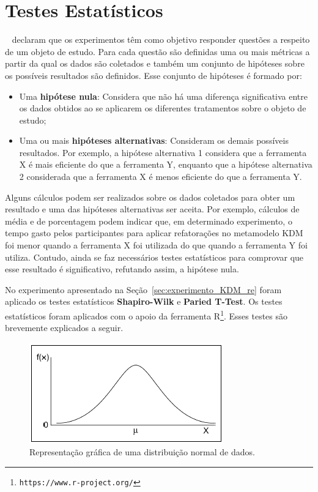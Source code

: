 \section{Testes Estatísticos}\label{sec:teste_estatisticos}

~ declaram que os experimentos têm como objetivo responder questões a respeito de um objeto de estudo. Para cada questão são definidas uma ou mais métricas a partir da qual os dados são coletados e também um conjunto de hipóteses sobre os possíveis resultados são definidos. Esse conjunto de hipóteses é formado por:

\begin{itemize}
\item Uma \textbf{hipótese nula}: Considera que não há uma diferença significativa entre os dados obtidos ao se aplicarem os diferentes tratamentos sobre o objeto de estudo;
\item Uma ou mais \textbf{hipóteses alternativas}: Consideram os demais possíveis resultados. Por exemplo, a hipótese alternativa 1 considera que a ferramenta X é mais eficiente do que a ferramenta Y, enquanto que a hipótese alternativa 2 considerada que a ferramenta X é menos eficiente do que a ferramenta Y.
\end{itemize}

Alguns cálculos podem ser realizados sobre os dados coletados para obter um resultado e uma das hipóteses alternativas ser aceita. Por exemplo, cálculos de média e de porcentagem podem indicar que, em determinado experimento, o tempo gasto pelos participantes para aplicar refatorações no metamodelo KDM foi menor quando a ferramenta X foi utilizada do que quando a ferramenta Y foi utiliza. Contudo, ainda se faz necessários testes estatísticos para comprovar que esse resultado é significativo, refutando assim, a hipótese nula.

No experimento apresentado na Seção~\ref{sec:experimento_KDM_re} foram aplicado os testes estatísticos \textbf{Shapiro-Wilk} e \textbf{Paried T-Test}. Os testes estatísticos foram aplicados com o apoio da ferramenta R\footnote{\texttt{https://www.r-project.org/}}. Esses testes são brevemente explicados a seguir. 

\begin{figure}[h]
	\centering
	\caption{Representação gráfica de uma distribuição normal de dados.}
	\label{fig:shapiro_wilk}
	\includegraphics[scale=0.9]{images/distribuicao_normal}
	\fautor
\end{figure}

